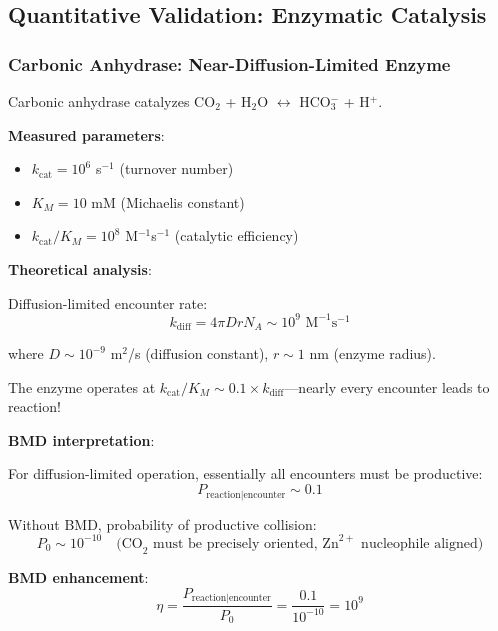 \documentclass[11pt,a4paper]{article}
\begin{document}
\subsection{Quantitative Validation: Enzymatic Catalysis}

\subsubsection{Carbonic Anhydrase: Near-Diffusion-Limited Enzyme}

Carbonic anhydrase catalyzes CO$_2$ + H$_2$O $\leftrightarrow$ HCO$_3^-$ + H$^+$.

\textbf{Measured parameters}\cite{lindskog1997structure}:
\begin{itemize}
\item $k_{\text{cat}} = 10^6$ s$^{-1}$ (turnover number)
\item $K_M = 10$ mM (Michaelis constant)
\item $k_{\text{cat}}/K_M = 10^8$ M$^{-1}$s$^{-1}$ (catalytic efficiency)
\end{itemize}

\textbf{Theoretical analysis}:

Diffusion-limited encounter rate:
\begin{equation}
k_{\text{diff}} = 4\pi D r N_A \sim 10^9 \text{ M}^{-1}\text{s}^{-1}
\end{equation}

where $D \sim 10^{-9}$ m$^2$/s (diffusion constant), $r \sim 1$ nm (enzyme radius).

The enzyme operates at $k_{\text{cat}}/K_M \sim 0.1 \times k_{\text{diff}}$—nearly every encounter leads to reaction!

\textbf{BMD interpretation}:

For diffusion-limited operation, essentially all encounters must be productive:
\begin{equation}
P_{\text{reaction}|\text{encounter}} \sim 0.1
\end{equation}

Without BMD, probability of productive collision:
\begin{equation}
P_0 \sim 10^{-10} \quad \text{(CO}_2\text{ must be precisely oriented, Zn}^{2+}\text{ nucleophile aligned)}
\end{equation}

\textbf{BMD enhancement}:
\begin{equation}
\eta = \frac{P_{\text{reaction}|\text{encounter}}}{P_0} = \frac{0.1}{10^{-10}} = 10^9
\end{equation}
\end{document}
